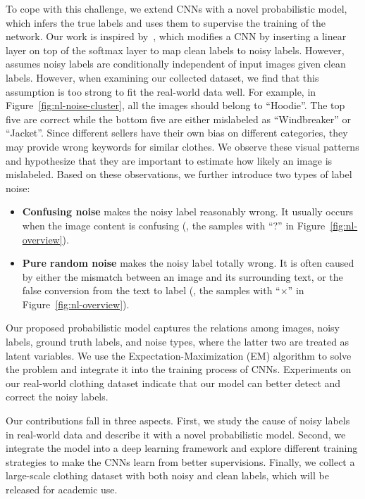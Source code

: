 To cope with this challenge, we extend CNNs with a novel probabilistic model, which infers the true labels and uses them to supervise the training of the network. Our work is inspired by~\cite{sukhbaatar2014learning}, which modifies a CNN by inserting a linear layer on top of the softmax layer to map clean labels to noisy labels. However,~\cite{sukhbaatar2014learning} assumes noisy labels are conditionally independent of input images given clean labels. However, when examining our collected dataset, we find that this assumption is too strong to fit the real-world data well. For example, in Figure~\ref{fig:nl-noise-cluster}, all the images should belong to ``Hoodie''. The top five are correct while the bottom five are either mislabeled as ``Windbreaker'' or ``Jacket''. Since different sellers have their own bias on different categories, they may provide wrong keywords for similar clothes. We observe these visual patterns and hypothesize that they are important to estimate how likely an image is mislabeled. Based on these observations, we further introduce two types of label noise:
\begin{itemize}
\item \textbf{Confusing noise} makes the noisy label reasonably wrong. It usually occurs when the image content is confusing (\eg, the samples with ``?'' in Figure~\ref{fig:nl-overview}).
\item \textbf{Pure random noise} makes the noisy label totally wrong. It is often caused by either the mismatch between an image and its surrounding text, or the false conversion from the text to label (\eg, the samples with ``$\times$'' in Figure~\ref{fig:nl-overview}).
\end{itemize}

Our proposed probabilistic model captures the relations among images, noisy labels, ground truth labels, and noise types, where the latter two are treated as latent variables. We use the Expectation-Maximization (EM) algorithm to solve the problem and integrate it into the training process of CNNs. Experiments on our real-world clothing dataset indicate that our model can better detect and correct the noisy labels.

Our contributions fall in three aspects. First, we study the cause of noisy labels in real-world data and describe it with a novel probabilistic model. Second, we integrate the model into a deep learning framework and explore different training strategies to make the CNNs learn from better supervisions. Finally, we collect a large-scale clothing dataset with both noisy and clean labels, which will be released for academic use.

